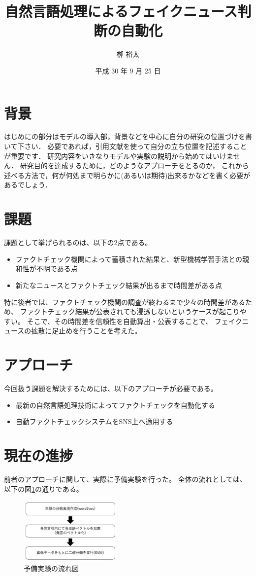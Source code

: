 \documentclass[twocolumn, a4paper, uplatex]{UECIEresume}
\title{自然言語処理によるフェイクニュース判断の自動化}
\date{平成 30 年 9 月 25 日}
\affiliation{総合情報学科 メディア情報学 コース}
\author{栁 裕太}
\begin{document}
\maketitle

\section{背景}
はじめにの部分はモデルの導入部，背景などを中心に自分の研究の位置づけを書いて下さい．
必要であれば，引用文献を使って自分の立ち位置を記述することが重要です．
研究内容をいきなりモデルや実験の説明から始めてはいけません．
研究目的を達成するために，どのようなアプローチをとるのか，
これから述べる方法で，何が何処まで明らかに(あるいは期待)出来るかなどを書く必要があるでしょう．

\section{課題}
課題として挙げられるのは、以下の2点である。
\begin{itemize}
  \item ファクトチェック機関によって蓄積された結果と、新型機械学習手法との親和性が不明である点
  \item 新たなニュースとファクトチェック結果が出るまで時間差がある点
\end{itemize}
特に後者では、ファクトチェック機関の調査が終わるまで少々の時間差があるため、
ファクトチェック結果が公表されても浸透しないというケースが起こりやすい。
そこで、その時間差を信頼性を自動算出・公表することで、
フェイクニュースの拡散に足止めを行うことを考えた。

\section{アプローチ}
今回扱う課題を解決するためには、以下のアプローチが必要である。
\begin{itemize}
  \item 最新の自然言語処理技術によってファクトチェックを自動化する
  \item 自動ファクトチェックシステムをSNS上へ適用する
\end{itemize}


\section{現在の進捗}
前者のアプローチに関して、実際に予備実験を行った。
全体の流れとしては、以下の図\ref{fig:nagare}の通りである。

\begin{figure}[h]
  \begin{center}
    \includegraphics[width=5cm]{fig1.jpg}
    \caption{予備実験の流れ図}
    \label{fig:nagare}
  \end{center}
\end{figure}
\end{document}

